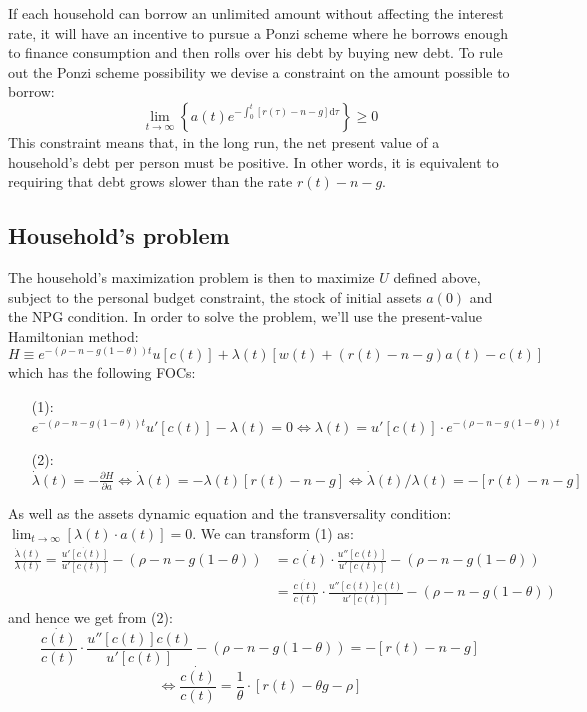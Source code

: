 \documentclass[12pt]{report}
\def\D{\mathrm{d}}
\begin{document}
If each household can borrow an unlimited amount without affecting the interest rate, it will have an incentive to pursue a Ponzi scheme where he borrows enough to finance consumption and then rolls over his debt by buying new debt. To rule out the Ponzi scheme possibility we devise a constraint on the amount possible to borrow: $$\lim_{t\to\infty}\left\lbrace a(t) e^{-\int_{0}^{t}[r(\tau) - n - g]\D\tau} \right\rbrace \geq 0 $$ This constraint means that, in the long run, the net present value of a household's debt per person must be positive. In other words, it is equivalent to requiring that debt grows slower than the rate $r(t) - n - g$.

\subsection{Household's problem}

The household's maximization problem is then to maximize $U$ defined above, subject to the personal budget constraint, the stock of initial assets $a(0)$ and the NPG condition. In order to solve the problem, we'll use the present-value Hamiltonian method: $$H \equiv e^{-(\rho - n - g(1-\theta))t} u[c(t)] + \lambda(t)\left[w(t) + (r(t) - n - g)a(t) - c(t)\right] $$ which has the following FOCs:\begin{itemize}
\item[(1):] $e^{-(\rho - n- g(1-\theta))t} u'[c(t)] - \lambda(t) = 0 \Leftrightarrow  \lambda(t)=  u'[c(t)]\cdot e^{-(\rho - n- g(1-\theta))t}$
\item[(2):] $\dot\lambda(t) = -\frac{\partial H}{\partial a} \Leftrightarrow \dot\lambda(t) = -\lambda(t)[r(t) - n - g] \Leftrightarrow \dot\lambda(t)/\lambda(t) = -[r(t) - n - g]$
\end{itemize} As well as the assets dynamic equation and the transversality condition: $\lim_{t\to\infty}[\lambda(t)\cdot a(t)] = 0$. We can transform (1) as: \begin{align*} 
\frac{\dot\lambda(t)}{\lambda(t)} = \frac{\dot{u'[c(t)]}}{u'[c(t)]} - (\rho - n- g(1-\theta)) & = \dot{c(t)} \cdot \frac{u''[c(t)]}{u'[c(t)]} - (\rho - n- g(1-\theta))\\ & = \frac{\dot{c(t)}}{c(t)} \cdot \frac{u''[c(t)]c(t)}{u'[c(t)]} - (\rho - n- g(1-\theta))
\end{align*}
and hence we get from (2): $$ \frac{\dot{c(t)}}{c(t)} \cdot \frac{u''[c(t)]c(t)}{u'[c(t)]} - (\rho - n - g(1-\theta)) = -[r(t) - n - g] $$ $$\Leftrightarrow \frac{\dot{c(t)}}{c(t)} = \frac{1}{\theta}\cdot [r(t) -\theta g - \rho] $$
\end{document}
